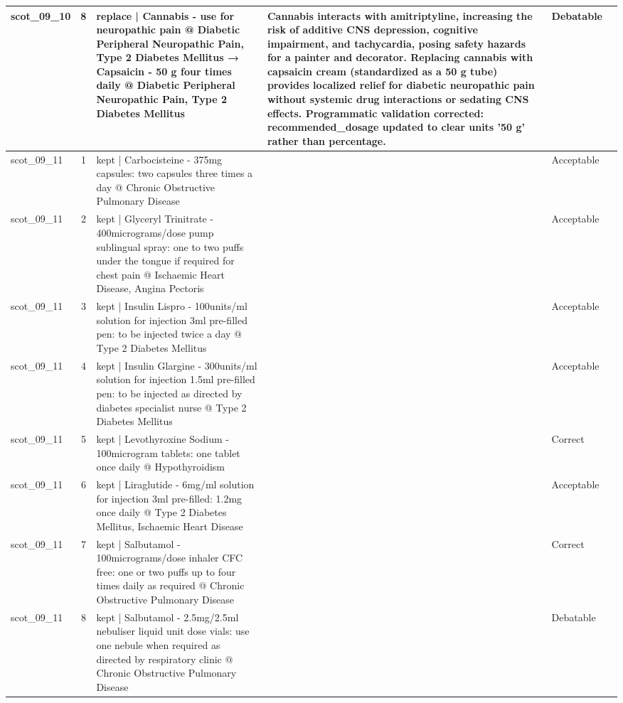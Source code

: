 \begin{longtable}{|p{1.45cm}|c|p{3.3cm}|p{6.5cm}|p{1.55cm}|p{2.3cm}|}
\hline
scot\_09\_10 & 8 & replace | Cannabis - use for neuropathic pain @ Diabetic Peripheral Neuropathic Pain, Type 2 Diabetes Mellitus → Capsaicin - 50 g four times daily @ Diabetic Peripheral Neuropathic Pain, Type 2 Diabetes Mellitus & Cannabis interacts with amitriptyline, increasing the risk of additive CNS depression, cognitive impairment, and tachycardia, posing safety hazards for a painter and decorator. Replacing cannabis with capsaicin cream (standardized as a 50 g tube) provides localized relief for diabetic neuropathic pain without systemic drug interactions or sedating CNS effects. Programmatic validation corrected: recommended\_dosage updated to clear units '50 g' rather than percentage. & Debatable &  \\
\hline
scot\_09\_11 & 1 & kept | Carbocisteine - 375mg capsules: two capsules three times a day @ Chronic Obstructive Pulmonary Disease &  & Acceptable &  \\
\hline
scot\_09\_11 & 2 & kept | Glyceryl Trinitrate - 400micrograms/dose pump sublingual spray: one to two puffs under the tongue if required for chest pain @ Ischaemic Heart Disease, Angina Pectoris &  & Acceptable &  \\
\hline
scot\_09\_11 & 3 & kept | Insulin Lispro - 100units/ml solution for injection 3ml pre-filled pen: to be injected twice a day @ Type 2 Diabetes Mellitus &  & Acceptable &  \\
\hline
scot\_09\_11 & 4 & kept | Insulin Glargine - 300units/ml solution for injection 1.5ml pre-filled pen: to be injected as directed by diabetes specialist nurse @ Type 2 Diabetes Mellitus &  & Acceptable &  \\
\hline
scot\_09\_11 & 5 & kept | Levothyroxine Sodium - 100microgram tablets: one tablet once daily @ Hypothyroidism &  & Correct &  \\
\hline
scot\_09\_11 & 6 & kept | Liraglutide - 6mg/ml solution for injection 3ml pre-filled: 1.2mg once daily @ Type 2 Diabetes Mellitus, Ischaemic Heart Disease &  & Acceptable &  \\
\hline
scot\_09\_11 & 7 & kept | Salbutamol - 100micrograms/dose inhaler CFC free: one or two puffs up to four times daily as required @ Chronic Obstructive Pulmonary Disease &  & Correct &  \\
\hline
scot\_09\_11 & 8 & kept | Salbutamol - 2.5mg/2.5ml nebuliser liquid unit dose vials: use one nebule when required as directed by respiratory clinic @ Chronic Obstructive Pulmonary Disease &  & Debatable &  \\
\hline

\end{longtable}
